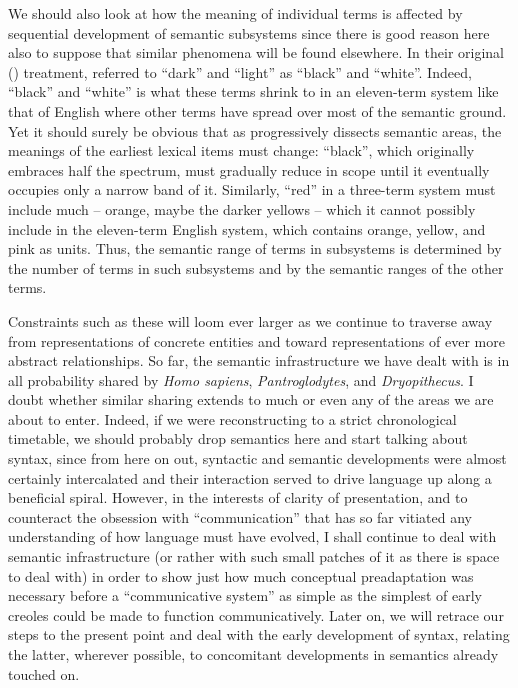 We should also look at how the meaning of individual terms is affected by sequential development of semantic subsystems since there is good reason here also to suppose that similar phenomena will be found elsewhere. In their original (\citeyear{Berlin1969}) treatment, \citeauthor{Berlin1969} referred to ``dark'' and ``light'' as ``black'' and ``white''. Indeed, ``black'' and ``white'' is what these terms shrink to in an eleven-term system like that of English where other terms have spread over most of the semantic ground. Yet it should surely be obvious that as  progressively dissects semantic areas, the meanings of the earliest lexical items must change: ``black'', which originally embraces half the spectrum, must gradually reduce in scope until it eventually occupies only a narrow band of it. Similarly, ``red'' in a three-term system must include much -- orange, maybe the darker yellows -- which it cannot possibly include in the eleven-term English system, which contains orange, yellow, and pink as units. Thus, the semantic range of terms in subsystems is determined by the number of terms in such subsystems and by the semantic ranges of the other terms.

Constraints such as these will loom ever larger as we continue to traverse  away from representations of concrete entities and toward representations of ever more abstract relationships. So far, the semantic infrastructure we have dealt with is in all probability shared by \textit{Homo sapiens}, \textit{Pantroglodytes}, and \textit{Dryopithecus}. I doubt whether similar sharing extends to much or even any of the areas we are about to enter. Indeed, if we were reconstructing to a strict chrono\-logical timetable, we should probably drop semantics here and start talking about syntax, since from here on out, syntactic and semantic developments were almost certainly intercalated and their interaction served to drive language up along a beneficial spiral. However, in the interests of clarity of presentation, and to counteract the obsession with ``communication'' that has so far vitiated any understanding
of how language must have evolved, I shall continue to deal with semantic infrastructure (or rather with such small patches of it as there is space to deal with) in order to show just how much conceptual preadaptation was necessary before a ``communicative system'' as simple as the simplest of early creoles could be made to function communicatively. Later on, we will retrace our steps to the present point and deal with the early development of syntax, relating the latter, wherever possible, to concomitant developments in semantics already touched on.\\\\

